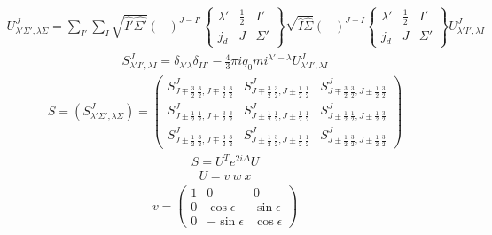 \documentclass[11pt,aps]{revtex4}
\begin{document}
\begin{equation}
\begin{split}
U^J_{\lambda'\Sigma',\lambda\Sigma}=\sum_{I'}\sum_{I}\sqrt{\hat{I'}\hat{\Sigma'}}(-)^{J-I'}
\begin{Bmatrix}
\lambda' & \frac 1 2  & I'\\
j_d & J & \Sigma'
\end{Bmatrix}
\sqrt{\hat{I}\hat{\Sigma}}(-)^{J-I}
\begin{Bmatrix}
\lambda' & \frac 1 2  & I'\\
j_d & J & \Sigma'
\end{Bmatrix}
U^J_{\lambda'I',\lambda I}
\end{split}
\end{equation}
\begin{equation}
\begin{split}
S^J_{\lambda' I',\lambda I}=\delta_{\lambda'\lambda}\delta_{II'}-\frac 4 3 \pi iq_0 mi^{\lambda'-\lambda}U^J_{\lambda' I',\lambda I}
\end{split}
\end{equation}
\begin{equation}
\begin{split}
S=(S^J_{\lambda'\Sigma', \lambda\Sigma})
=\begin{pmatrix}
S^J_{J\mp\frac3 2\ \frac3 2,J\mp\frac3 2\ \frac3 2} & S^J_{J\mp\frac3 2\ \frac3 2,J\pm\frac1 2\ \frac1 2} &  S^J_{J\mp\frac3 2\ \frac3 2,J\pm\frac1 2\ \frac3 2}\\
S^J_{J\pm\frac1 2\ \frac1 2,J\mp\frac3 2\ \frac3 2} & S^J_{J\pm\frac1 2\ \frac1 2,J\pm\frac1 2\ \frac1 2} &  S^J_{J\pm\frac1 2\ \frac1 2,J\pm\frac1 2\ \frac3 2}\\
S^J_{J\pm\frac1 2\ \frac3 2,J\mp\frac3 2\ \frac3 2} & S^J_{J\pm\frac1 2\ \frac3 2,J\pm\frac1 2\ \frac1 2} &  S^J_{J\pm\frac1 2\ \frac3 2,J\pm\frac1 2\ \frac3 2}
\end{pmatrix}
\end{split}
\end{equation}
\begin{equation}
\begin{split}
S=U^T e^{2i\Delta} U
\end{split}
\end{equation}
\begin{equation}
\begin{split}
U=v\ w\ x
\end{split}
\end{equation}
\begin{equation}
\begin{split}
v=
\begin{pmatrix}
1 & 0 & 0 \\
0 & \cos \epsilon & \sin \epsilon\\
0 & -\sin \epsilon & \cos \epsilon
\end{pmatrix}
\end{split}
\end{equation}
\end{document}
